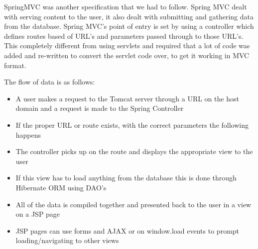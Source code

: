 \noindent SpringMVC was another specification that we had to follow. Spring MVC dealt with serving content to the user, it also dealt with submitting and gathering data from the database. Spring MVC's point of entry is set by using a controller which defines routes based of URL's and parameters passed through to those URL's. This completely different from using servlets and required that a lot of code was added and re-written to convert the servlet code over, to get it working in MVC format. \newline

\noindent The flow of data is as follows:

\begin{itemize}
	\item A user makes a request to the Tomcat server through a URL on the host domain and a request is made to the Spring Controller
	\item If the proper URL or route exists, with the correct parameters the following happens
	\item The controller picks up on the route and displays the appropriate view to the user
	\item If this view has to load anything from the database this is done through Hibernate ORM using DAO's
	\item All of the data is compiled together and presented back to the user in a view on a JSP page
	\item JSP pages can use forms and AJAX or on window.load events to prompt loading/navigating to other views
\end{itemize}


